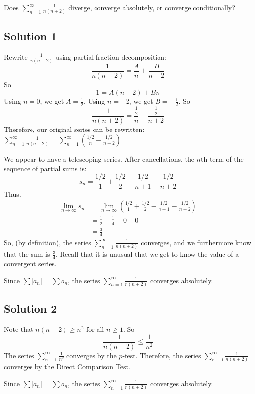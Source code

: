 \documentclass{article}
\begin{document}
\noindent
Does $\displaystyle \sum_{n=1}^\infty \frac{1}{n(n+2)}$
diverge, converge absolutely, or converge conditionally?

\subsection*{Solution 1}

Rewrite $\frac1{n(n+2)}$ using partial fraction decomposition:
\[ \frac1{n(n+2)} = \frac{A}{n} + \frac{B}{n+2}\]
So
\[ 1 = A(n+2) + Bn\]
Using $n=0$, we get $A =\frac12$. Using $n=-2$, we get $B=-\frac12$. So
\[ \frac1{n(n+2)} = \frac{\frac12}{n} - \frac{\frac12}{n+2}\]
Therefore, our original series can be rewritten:
$\displaystyle \sum_{n=1}^\infty \frac{1}{n(n+2)} =  \displaystyle \sum_{n=1}^\infty \left( \frac{1/2}{n} - \frac{1/2}{n+2} \right)$

\vskip20pt
\noindent
We appear to have a telescoping series. After cancellations, the $n$th term of the sequence of partial sums is:
\[ s_n = \frac{1/2}{1} + \frac{1/2}{2} - \frac{1/2}{n+1} - \frac{1/2}{n+2}\]
Thus,
\begin{align*}
\lim_{n \to \infty} s_n
&=  \lim_{n \to \infty} \left( \frac{1/2}{1} + \frac{1/2}{2} - \frac{1/2}{n+1} - \frac{1/2}{n+2}\right) \\
&=  \frac12 + \frac14 - 0 - 0\\
&= \frac34
\end{align*}
So, (by definition), the series $\displaystyle \sum_{n=1}^\infty \frac{1}{n(n+2)}$ converges, and we furthermore know that the sum is $\frac34$. Recall that it is unusual that we get to know the value of a convergent series.

Since $\sum |a_n| = \sum a_n$, the series $\displaystyle \sum_{n=1}^\infty \frac{1}{n(n+2)}$ converges absolutely.

\subsection*{Solution 2}

Note that $n(n+2) \geq n^2$ for all $n \geq 1$. So
\[ \frac1{n(n+2)} \leq \frac{1}{n^2}\]
The series $\displaystyle \sum_{n=1}^\infty  \frac{1}{n^2}$ converges by the $p$-test. Therefore, the series  $\displaystyle \sum_{n=1}^\infty \frac{1}{n(n+2)}$ converges by the Direct Comparison Test.

Since $\sum |a_n| = \sum a_n$, the series $\displaystyle \sum_{n=1}^\infty \frac{1}{n(n+2)}$ converges absolutely.
\end{document}
